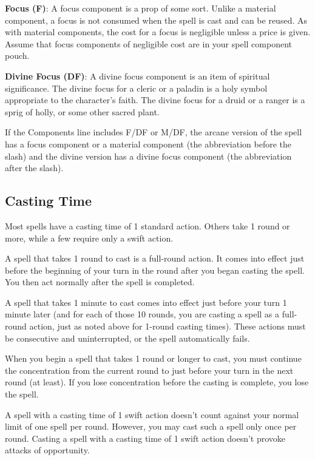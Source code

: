 \textbf{Focus (F)}: A focus component is a prop of some sort. Unlike a material component, a focus is not consumed when the spell is cast and can be reused. As with material components, the cost for a focus is negligible unless a price is given. Assume that focus components of negligible cost are in your spell component pouch.
				
\textbf{Divine Focus (DF)}: A divine focus component is an item of spiritual significance. The divine focus for a cleric or a paladin is a holy symbol appropriate to the character's faith. The divine focus for a druid or a ranger is a sprig of holly, or some other sacred plant.
				
If the Components line includes F/DF or M/DF, the arcane version of the spell has a focus component or a material component (the abbreviation before the slash) and the divine version has a divine focus component (the abbreviation after the slash).
				
\subsection{Casting Time}

				
Most spells have a casting time of 1 standard action. Others take 1 round or more, while a few require only a swift action.
				
A spell that takes 1 round to cast is a full-round action. It comes into effect just before the beginning of your turn in the round after you began casting the spell. You then act normally after the spell is completed.
				
A spell that takes 1 minute to cast comes into effect just before your turn 1 minute later (and for each of those 10 rounds, you are casting a spell as a full-round action, just as noted above for 1-round casting times). These actions must be consecutive and uninterrupted, or the spell automatically fails.
				
When you begin a spell that takes 1 round or longer to cast, you must continue the concentration from the current round to just before your turn in the next round (at least). If you lose concentration before the casting is complete, you lose the spell.
				
A spell with a casting time of 1 swift action doesn't count against your normal limit of one spell per round. However, you may cast such a spell only once per round. Casting a spell with a casting time of 1 swift action doesn't provoke attacks of opportunity.
				
